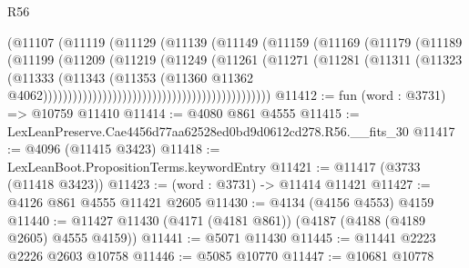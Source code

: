 \begin{lexlean}{R56}
\begin{coremodule}
                                                    (@11107
                                                      (@11119
                                                        (@11129
                                                          (@11139
                                                            (@11149
                                                              (@11159
                                                                (@11169
                                                                  (@11179
                                                                    (@11189
                                                                      (@11199
                                                                        (@11209
                                                                          (@11219
                                                                            (@11249
                                                                              (@11261
                                                                                (@11271
                                                                                  (@11281
                                                                                    (@11311
                                                                                      (@11323
                                                                                        (@11333
                                                                                          (@11343
                                                                                            (@11353
                                                                                              (@11360
                                                                                                @11362
                                                                                                @4062))))))))))))))))))))))))))))))))))))))))))))))
@11412 := fun (word : @3731) => @10759 @11410
@11414 := @4080 @861 @4555
@11415 := LexLeanPreserve.Cae4456d77aa62528ed0bd9d0612cd278.R56.__fits_30
@11417 := @4096 (@11415 @3423)
@11418 := LexLeanBoot.PropositionTerms.keywordEntry
@11421 := @11417 (@3733 (@11418 @3423))
@11423 := (word : @3731) -> @11414 @11421
@11427 := @4126 @861 @4555 @11421 @2605
@11430 := @4134 (@4156 @4553) @4159
@11440 := @11427 @11430 (@4171 (@4181 @861)) (@4187 (@4188 (@4189 @2605) @4555 @4159))
@11441 := @5071 @11430
@11445 := @11441 @2223 @2226 @2603 @10758
@11446 := @5085 @10770
@11447 := @10681 @10778

\end{coremodule}
\end{lexlean}
